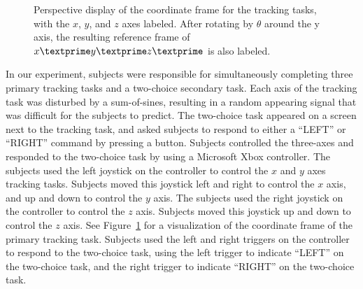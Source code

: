 \begin{figure}[b!]
\begin{center}

        \caption[Perspective display of the coordinate frame for the tracking tasks]{Perspective display of the coordinate frame for the tracking tasks, with the $x$, $y$, and $z$ axes labeled. After rotating by $\theta$ around the y axis, the resulting reference frame of $x\textprime y\textprime z\textprime$ is also labeled.}
        \label{designdiagram}
    \end{center}
\end{figure}

In our experiment, subjects were responsible for simultaneously completing three primary tracking tasks and a two-choice secondary task.
Each axis of the tracking task was disturbed by a sum-of-sines, resulting in a random appearing signal that was difficult for the subjects to predict.
The two-choice task appeared on a screen next to the tracking task, and asked subjects to respond to either a ``LEFT'' or ``RIGHT'' command by pressing a button.
Subjects controlled the three-axes and responded to the two-choice task by using a Microsoft Xbox controller.
The subjects used the left joystick on the controller to control the $x$ and $y$ axes tracking tasks.
Subjects moved this joystick left and right to control the $x$ axis, and up and down to control the $y$ axis.
The subjects used the right joystick on the controller to control the $z$ axis.
Subjects moved this joystick up and down to control the $z$ axis.
See Figure~\ref{designdiagram} for a visualization of the coordinate frame of the primary tracking task.
Subjects used the left and right triggers on the controller to respond to the two-choice task, using the left trigger to indicate ``LEFT'' on the two-choice task, and the right trigger to indicate ``RIGHT'' on the two-choice task.


